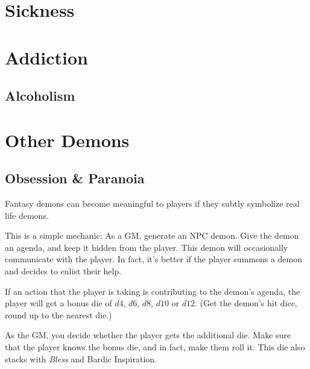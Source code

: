 \documentclass[twocolumn]{dndbook}
\begin{document}
\section{Sickness}
\section{Addiction}
\subsection{Alcoholism}

\section{Other Demons}
\subsection{Obsession \& Paranoia}


\begin{emphasisParagraph}
	Fantasy demons can become meaningful to players if they subtly symbolize real life demons.
\end{emphasisParagraph}

This is a simple mechanic: As a GM, generate an NPC demon.
Give the demon an agenda, and keep it hidden from the player.
This demon will occasionally communicate with the player.
In fact, it's better if the player summons a demon and decides to enlist their help.\par

If an action that the player is taking is contributing to the demon's agenda, the player will get a bonus die of $d4$, $d6$, $d8$, $d10$ or $d12$.
(Get the demon's hit dice, round up to the nearest die.)\par
As the GM, you decide whether the player gets the additional die. Make sure that the player knows the bonus die, and in fact, make them roll it.
This die also stacks with \emph{Bless} and Bardic Inspiration.\par
\end{document}
